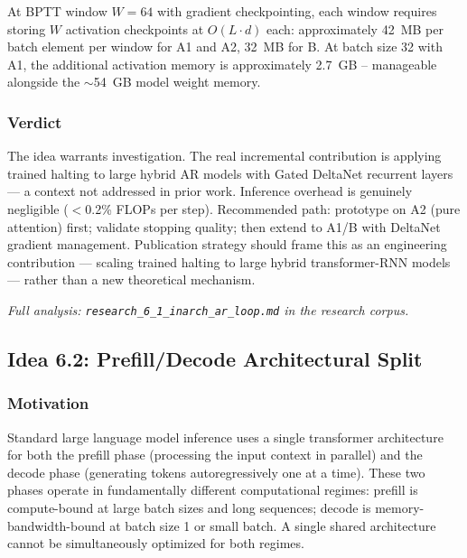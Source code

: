 \documentclass[11pt]{article}
\begin{document}
At BPTT window $W = 64$ with gradient checkpointing, each window requires storing $W$ activation checkpoints at $O(L \cdot d)$ each: approximately 42~MB per batch element per window for A1 and A2, 32~MB for B. At batch size 32 with A1, the additional activation memory is approximately 2.7~GB -- manageable alongside the $\sim$54~GB model weight memory.

\subsubsection*{Verdict}

The idea warrants investigation. The real incremental contribution is applying trained halting to large hybrid AR models with Gated DeltaNet recurrent layers --- a context not addressed in prior work. Inference overhead is genuinely negligible ($<$0.2\% FLOPs per step). Recommended path: prototype on A2 (pure attention) first; validate stopping quality; then extend to A1/B with DeltaNet gradient management. Publication strategy should frame this as an engineering contribution --- scaling trained halting to large hybrid transformer-RNN models --- rather than a new theoretical mechanism.

\par\noindent\textit{Full analysis: \texttt{research\_6\_1\_inarch\_ar\_loop.md} in the research corpus.}

\subsection{Idea 6.2: Prefill/Decode Architectural Split}
\label{sec:idea_6_2}

\subsubsection*{Motivation}

Standard large language model inference uses a single transformer architecture for both the prefill phase (processing the input context in parallel) and the decode phase (generating tokens autoregressively one at a time). These two phases operate in fundamentally different computational regimes: prefill is compute-bound at large batch sizes and long sequences; decode is memory-bandwidth-bound at batch size 1 or small batch. A single shared architecture cannot be simultaneously optimized for both regimes.
\end{document}
